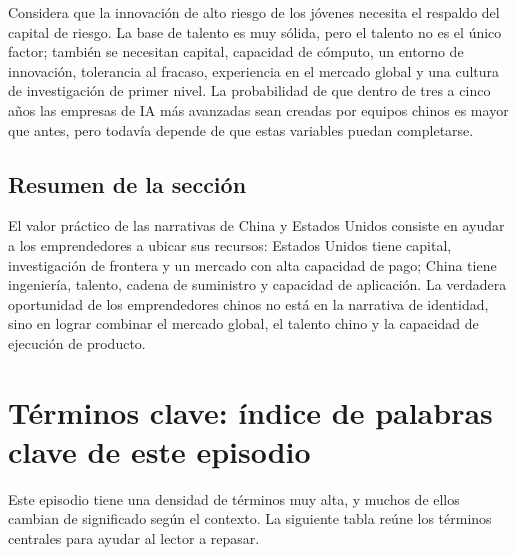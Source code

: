 \documentclass[a4paper]{article}
\begin{document}
Considera que la innovación de alto riesgo de los jóvenes necesita el respaldo del capital de riesgo. La base de talento es muy sólida, pero el talento no es el único factor; también se necesitan capital, capacidad de cómputo, un entorno de innovación, tolerancia al fracaso, experiencia en el mercado global y una cultura de investigación de primer nivel. La probabilidad de que dentro de tres a cinco años las empresas de IA más avanzadas sean creadas por equipos chinos es mayor que antes, pero todavía depende de que estas variables puedan completarse.

\subsection{Resumen de la sección}

El valor práctico de las narrativas de China y Estados Unidos consiste en ayudar a los emprendedores a ubicar sus recursos: Estados Unidos tiene capital, investigación de frontera y un mercado con alta capacidad de pago; China tiene ingeniería, talento, cadena de suministro y capacidad de aplicación. La verdadera oportunidad de los emprendedores chinos no está en la narrativa de identidad, sino en lograr combinar el mercado global, el talento chino y la capacidad de ejecución de producto.
\section{Términos clave: índice de palabras clave de este episodio}

Este episodio tiene una densidad de términos muy alta, y muchos de ellos cambian de significado según el contexto. La siguiente tabla reúne los términos centrales para ayudar al lector a repasar.
\end{document}
